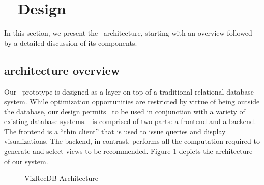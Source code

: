 
\section{{\large \VizRecDB\ } Design}
\label{sec:system_architecture}

In this section, we present the \VizRecDB\ architecture, starting with an
overview followed by a detailed discussion of its components.

\subsection{{\large \VizRecDB} architecture overview}
\label{subsec:overview}

Our \VizRecDB\ prototype is designed as a layer on top of a traditional
relational database system.
While optimization opportunities are restricted by virtue of being outside the
database, our design permits \VizRecDB\ to be used in conjunction with a variety of
existing database systems. 
\VizRecDB\ is comprised of two parts: a frontend and a backend. 
The frontend is a ``thin client'' that
is used to issue queries and display visualizations. The backend, in
contrast, performs all the computation required to generate and select views
to be recommended. Figure \ref{fig:sys-arch}
depicts the architecture of our system.

\begin{figure}[htb]
\vspace{-10pt}
\centerline{
\hbox{}}
\caption{VizRecDB Architecture}
\label{fig:sys-arch}
\vspace{-15pt}
\end{figure} 

